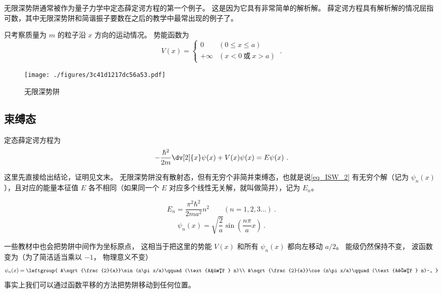 

无限深势阱通常被作为量子力学中定态薛定谔方程的第一个例子。 这是因为它具有非常简单的解析解。 薛定谔方程具有解析解的情况屈指可数，其中无限深势阱和简谐振子要数在之后的教学中最常出现的例子了。

只考察质量为 $m$ 的粒子沿 $x$ 方向的运动情况。%
势能函数为
\begin{equation}
V(x) =
\begin{cases}
0 \quad &(0 \leqslant x \leqslant a)\\
+\infty  &(x < 0 \ \text{或}\  x > a)
\end{cases}~.
\end{equation}

\begin{figure}[ht]
\centering
\texttt{[image: ./figures/3c41d1217dc56a53.pdf]}
\caption{无限深势阱} \label{fig_ISW_1}
\end{figure}

\subsection{束缚态}
定态薛定谔方程为
\begin{equation}\label{eq_ISW_2}
-\frac{\hbar ^2}{2m} \dv[2]{x} \psi(x) + V(x)\psi(x) = E\psi(x)~.
\end{equation} 

这里先直接给出结论，证明见文末。 无限深势阱没有散射态，但有无穷个非简并束缚态，也就是说\autoref{eq_ISW_2} 有无穷个解（记为 $\psi_n(x)$），且对应的能量本征值 $E$ 各不相同（如果同一个 $E$ 对应多个线性无关解，就叫做简并），记为 $E_n$。

\begin{equation}\label{eq_ISW_3}
E_n = \frac{\pi^2 \hbar^2}{2m a^2} n^2 \qquad (n = 1,2,3\dots)~.
\end{equation}
\begin{equation}\label{eq_ISW_1}
\psi_n(x) = \sqrt{\frac{2}{a}} \sin(\frac{n\pi }{a} x)~.
\end{equation}

一些教材中也会把势阱中间作为坐标原点， 这相当于把这里的势能 $V(x)$ 和所有 $\psi_n(x)$ 都向左移动 $a/2$。 能级仍然保持不变， 波函数变为（为了简洁适当乘以 $-1$， 物理意义不变）
\begin{equation}
\psi_n(x) = \leftgroup{
    &\sqrt{\frac{2}{a}}\sin(n\pi x/a)\qquad (\text{偶数 } n)\\
    &\sqrt{\frac{2}{a}}\cos(n\pi x/a)\qquad (\text{奇数 } n)~,
}\end{equation}
事实上我们可以通过函数平移的方法把势阱移动到任何位置。

